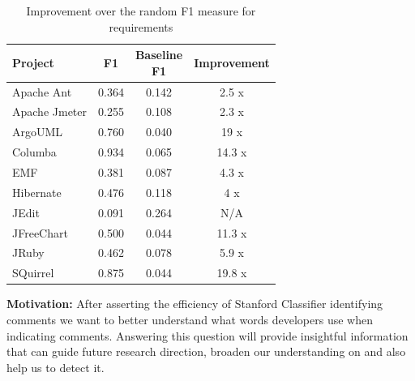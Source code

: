 \begin{table}[!thb]
    \begin{center}
        \caption{Improvement over the random F1 measure for requirements}
        \label{tbl:improvement_f1measure_requirement}
        \begin{tabular}{l| c c c }
        \toprule
        \textbf{Project} & \textbf{F1} & \thead{Baseline\\F1} & \textbf{Improvement}\\
        \midrule
         Apache Ant      & 0.364 & 0.142  &  2.5  x\\
         Apache Jmeter   & 0.255 & 0.108  &  2.3  x\\
         ArgoUML         & 0.760 & 0.040  &  19   x\\
         Columba         & 0.934 & 0.065  &  14.3 x\\
         EMF             & 0.381 & 0.087  &  4.3  x\\
         Hibernate       & 0.476 & 0.118  &  4    x\\
         JEdit           & 0.091 & 0.264  &  N/A   \\
         JFreeChart      & 0.500 & 0.044  &  11.3 x\\
         JRuby           & 0.462 & 0.078  &  5.9  x\\
         SQuirrel        & 0.875 & 0.044  &  19.8 x\\
        \bottomrule
        \end{tabular}
    \end{center}    
\end{table}


\vspace{3mm}
\noindent\rqii
\vspace{3mm}

\noindent \textbf{Motivation:} After asserting the efficiency of Stanford Classifier identifying \SATD comments we want to better understand what words developers use when indicating \SATD comments. Answering this question will provide insightful information that can guide future research direction, broaden our understanding on \SATD and also help us to detect it.     

